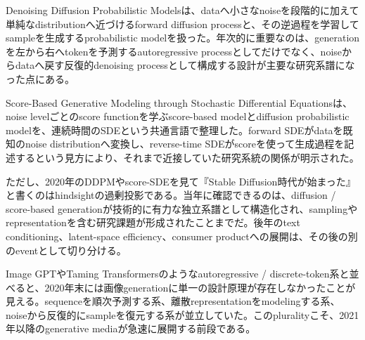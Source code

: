 Denoising Diffusion Probabilistic Modelsは、dataへ小さなnoiseを段階的に加えて単純なdistributionへ近づけるforward diffusion processと、その逆過程を学習してsampleを生成するprobabilistic modelを扱った。年次的に重要なのは、generationを左から右へtokenを予測するautoregressive processとしてだけでなく、noiseからdataへ戻す反復的denoising processとして構成する設計が主要な研究系譜になった点にある。\autocite{src-d6e451e5085e}


Score-Based Generative Modeling through Stochastic Differential Equationsは、noise levelごとのscore functionを学ぶscore-based modelとdiffusion probabilistic modelを、連続時間のSDEという共通言語で整理した。forward SDEがdataを既知のnoise distributionへ変換し、reverse-time SDEがscoreを使って生成過程を記述するという見方により、それまで近接していた研究系統の関係が明示された。\autocite{src-c012a248ff78}


ただし、2020年のDDPMやscore-SDEを見て『Stable Diffusion時代が始まった』と書くのはhindsightの過剰投影である。当年に確認できるのは、diffusion / score-based generationが技術的に有力な独立系譜として構造化され、samplingやrepresentationを含む研究課題が形成されたことまでだ。後年のtext conditioning、latent-space efficiency、consumer productへの展開は、その後の別のeventとして切り分ける。\autocite{src-c012a248ff78,src-d6e451e5085e}


Image GPTやTaming Transformersのようなautoregressive / discrete-token系と並べると、2020年末には画像generationに単一の設計原理が存在しなかったことが見える。sequenceを順次予測する系、離散representationをmodelingする系、noiseから反復的にsampleを復元する系が並立していた。このpluralityこそ、2021年以降のgenerative mediaが急速に展開する前段である。\autocite{src-c012a248ff78,src-d6e451e5085e}


